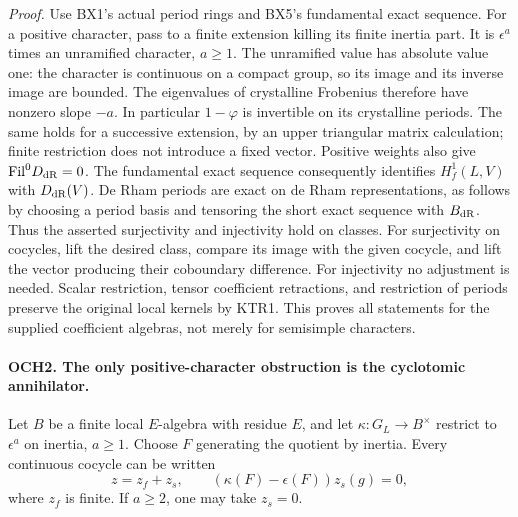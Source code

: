 \emph{Proof.}
Use BX1's actual period rings and BX5's fundamental exact sequence.
For a positive character, pass to a finite extension killing its
finite inertia part.  It is \(\epsilon^a\) times an unramified
character, \(a\ge1\).  The unramified value has absolute value one:
the character is continuous on a compact group, so its image and its
inverse image are bounded.  The eigenvalues of crystalline Frobenius
therefore have nonzero slope \(-a\).  In particular \(1-\varphi\)
is invertible on its crystalline periods.  The same holds for a
successive extension, by an upper triangular matrix calculation;
finite restriction does not introduce a fixed vector.  Positive
weights also give \(\mathrm{Fil}^0D_{\rm dR}=0\).
The fundamental exact sequence consequently identifies
\(H^1_f(L,V)\) with \(D_{\rm dR}(V)\).  De Rham periods are
exact on de Rham representations, as follows by choosing a period
basis and tensoring the short exact sequence with \(B_{\rm dR}\).
Thus the asserted surjectivity and injectivity hold on classes.
For surjectivity on cocycles, lift the desired class, compare its
image with the given cocycle, and lift the vector producing their
coboundary difference.  For injectivity no adjustment is needed.
Scalar restriction, tensor coefficient retractions, and restriction
of periods preserve the original local kernels by KTR1.  This proves
all statements for the supplied coefficient algebras, not merely for
semisimple characters.

\paragraph{OCH2. The only positive-character obstruction is the cyclotomic annihilator.}
\label{claim:OCH2}
Let \(B\) be a finite local \(E\)-algebra with residue \(E\),
and let \(\kappa:G_L\to B^\times\) restrict to \(\epsilon^a\)
on inertia, \(a\ge1\).  Choose \(F\) generating the quotient
by inertia.  Every continuous cocycle can be written
\[
                  z=z_f+z_s,
 \qquad (\kappa(F)-\epsilon(F))z_s(g)=0,
 \tag{OCH.2}
\]
where \(z_f\) is finite.  If \(a\ge2\), one may take
\(z_s=0\).

